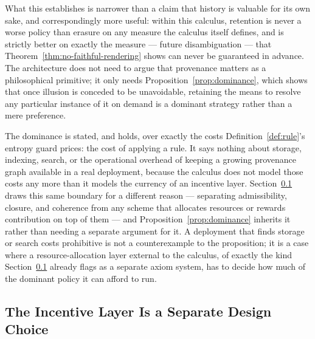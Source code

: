 \documentclass[11pt]{article}
\theoremstyle{definition}
\begin{document}
What this establishes is narrower than a claim that history is valuable for its own sake, and correspondingly more useful: within this calculus, retention is never a worse policy than erasure on any measure the calculus itself defines, and is strictly better on exactly the measure --- future disambiguation --- that Theorem~\ref{thm:no-faithful-rendering} shows can never be guaranteed in advance. The architecture does not need to argue that provenance matters as a philosophical primitive; it only needs Proposition~\ref{prop:dominance}, which shows that once illusion is conceded to be unavoidable, retaining the means to resolve any particular instance of it on demand is a dominant strategy rather than a mere preference.

The dominance is stated, and holds, over exactly the costs Definition~\ref{def:rule}'s entropy guard prices: the cost of applying a rule. It says nothing about storage, indexing, search, or the operational overhead of keeping a growing provenance graph available in a real deployment, because the calculus does not model those costs any more than it models the currency of an incentive layer. Section~\ref{sec:incentive-layer} draws this same boundary for a different reason --- separating admissibility, closure, and coherence from any scheme that allocates resources or rewards contribution on top of them --- and Proposition~\ref{prop:dominance} inherits it rather than needing a separate argument for it. A deployment that finds storage or search costs prohibitive is not a counterexample to the proposition; it is a case where a resource-allocation layer external to the calculus, of exactly the kind Section~\ref{sec:incentive-layer} already flags as a separate axiom system, has to decide how much of the dominant policy it can afford to run.

\subsection{The Incentive Layer Is a Separate Design Choice}
\label{sec:incentive-layer}
\end{document}

